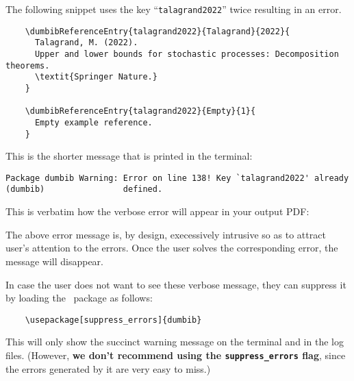 \documentclass[letter, 12pt]{article}
\begin{document}
  The following snippet uses the key ``\texttt{talagrand2022}'' twice resulting in an error.
  \begin{verbatim}
    \dumbibReferenceEntry{talagrand2022}{Talagrand}{2022}{
      Talagrand, M. (2022).
      Upper and lower bounds for stochastic processes: Decomposition theorems.
      \textit{Springer Nature.}
    }
    
    \dumbibReferenceEntry{talagrand2022}{Empty}{1}{
      Empty example reference.
    }
  \end{verbatim}
  This is the shorter message that is printed in the terminal:
\begin{verbatim}
Package dumbib Warning: Error on line 138! Key `talagrand2022' already
(dumbib)                defined.
\end{verbatim}
  This is verbatim how the verbose error will appear in your output PDF:
  
  
  The above error message is, by design, execessively intrusive so as to attract user's attention to the errors. Once the user solves the corresponding error, the message will disappear.

  In case the user does not want to see these verbose message, they can suppress it by loading the \dumbib\ package as follows:
  \begin{verbatim}
    \usepackage[suppress_errors]{dumbib}
  \end{verbatim}
  This will only show the succinct warning message on the terminal and in the log files. (However, \textbf{we don't recommend using the \texttt{suppress\_errors} flag}, since the errors generated by it are very easy to miss.)
  
\end{document}

